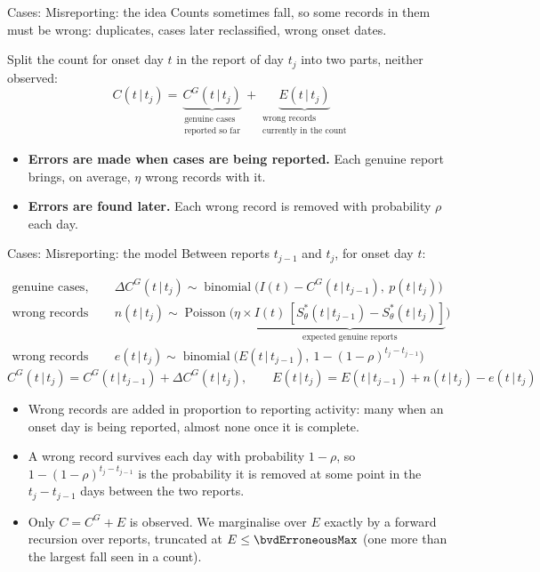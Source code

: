\documentclass[aspectratio=169,9pt]{beamer}
\newcommand{\given}{\,|\,}
\begin{document}
\begin{frame}{Cases: Misreporting: the idea}
Counts sometimes fall, so some records in them must be wrong: duplicates,
cases later reclassified, wrong onset dates.

\bigskip
Split the count for onset day $t$ in the report of day $t_j$ into two parts,
neither observed:
\[
C(t\given t_j)=\underbrace{C^{G}(t\given t_j)}_{\substack{\text{genuine cases}\\\text{reported so far}}}
+\underbrace{E(t\given t_j)}_{\substack{\text{wrong records}\\\text{currently in the count}}}
\]

\medskip
\begin{itemize}
\item \textbf{Errors are made when cases are being reported.} Each genuine
report brings, on average, $\eta$ wrong records with it.
\item \textbf{Errors are found later.} Each wrong record is removed with
probability $\rho$ each day.
\end{itemize}
\end{frame}

\begin{frame}{Cases: Misreporting: the model}
Between reports $t_{j-1}$ and $t_j$, for onset day $t$:

\medskip
\begin{align*}
\text{genuine cases, newly reported}\quad & \Delta C^{G}(t\given t_j)\sim\operatorname{binomial}\bigl(I(t)-C^{G}(t\given t_{j-1}),\ p(t\given t_j)\bigr)\\[3pt]
\text{wrong records added}\quad & n(t\given t_j)\sim\operatorname{Poisson}\bigl(\eta\times
\underbrace{I(t)\,[S^{*}_\theta(t\given t_{j-1})-S^{*}_\theta(t\given t_j)]}_{\text{expected genuine reports}}\bigr)\\[3pt]
\text{wrong records removed}\quad & e(t\given t_j)\sim\operatorname{binomial}\bigl(E(t\given t_{j-1}),\ 1-(1-\rho)^{t_j-t_{j-1}}\bigr)
\end{align*}
\[
C^{G}(t\given t_j)=C^{G}(t\given t_{j-1})+\Delta C^{G}(t\given t_j),\qquad E(t\given t_j)=E(t\given t_{j-1})+n(t\given t_j)-e(t\given t_j)
\]

\smallskip
\small
\begin{itemize}
\item Wrong records are added in proportion to reporting activity: many when
an onset day is being reported, almost none once it is complete.
\item A wrong record survives each day with probability $1-\rho$, so
$1-(1-\rho)^{t_j-t_{j-1}}$ is the probability it is removed at some point in
the $t_j-t_{j-1}$ days between the two reports.
\item Only $C=C^{G}+E$ is observed. We marginalise over $E$ exactly by a forward
recursion over reports, truncated at $E\le\bvdErroneousMax$ (one more than
the largest fall seen in a count).
\end{itemize}
\end{frame}
\end{document}
